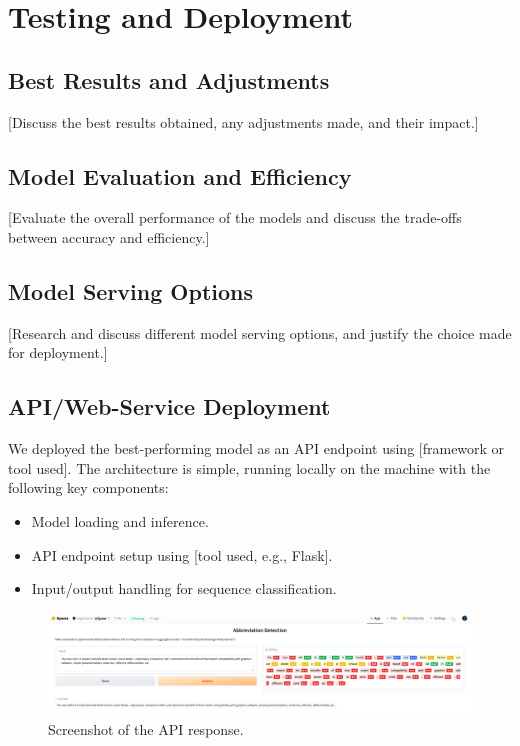 \documentclass[a4paper,11pt]{article}
\begin{document}
\section{Testing and Deployment}\label{sec:testing-deployment}
\subsection{Best Results and Adjustments}
[Discuss the best results obtained, any adjustments made, and their impact.]

\subsection{Model Evaluation and Efficiency}
[Evaluate the overall performance of the models and discuss the trade-offs between accuracy and efficiency.]

\subsection{Model Serving Options}
[Research and discuss different model serving options, and justify the choice made for deployment.]

\subsection{API/Web-Service Deployment}
We deployed the best-performing model as an API endpoint using [framework or
		tool used]. The architecture is simple, running locally on the machine with the
following key components:

\begin{itemize}
	\item Model loading and inference.
	\item API endpoint setup using [tool used, e.g., Flask].
	\item Input/output handling for sequence classification.
\end{itemize}

\begin{figure}[H]
	\centering
	\includegraphics[width=\textwidth]{./assets/demo.png}
	\caption{Screenshot of the API response.}\label{fig:api-screenshot}
\end{figure}
\end{document}

